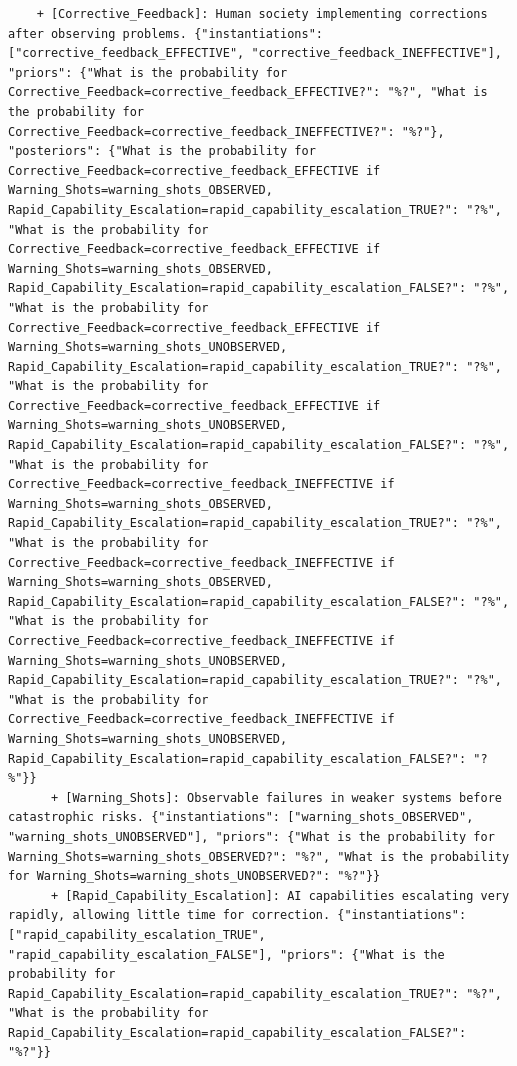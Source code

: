 \documentclass[
  11pt,
  letterpaper,
]{book}
\begin{document}
\begin{verbatim}
    + [Corrective_Feedback]: Human society implementing corrections after observing problems. {"instantiations": ["corrective_feedback_EFFECTIVE", "corrective_feedback_INEFFECTIVE"], "priors": {"What is the probability for Corrective_Feedback=corrective_feedback_EFFECTIVE?": "%?", "What is the probability for Corrective_Feedback=corrective_feedback_INEFFECTIVE?": "%?"}, "posteriors": {"What is the probability for Corrective_Feedback=corrective_feedback_EFFECTIVE if Warning_Shots=warning_shots_OBSERVED, Rapid_Capability_Escalation=rapid_capability_escalation_TRUE?": "?%", "What is the probability for Corrective_Feedback=corrective_feedback_EFFECTIVE if Warning_Shots=warning_shots_OBSERVED, Rapid_Capability_Escalation=rapid_capability_escalation_FALSE?": "?%", "What is the probability for Corrective_Feedback=corrective_feedback_EFFECTIVE if Warning_Shots=warning_shots_UNOBSERVED, Rapid_Capability_Escalation=rapid_capability_escalation_TRUE?": "?%", "What is the probability for Corrective_Feedback=corrective_feedback_EFFECTIVE if Warning_Shots=warning_shots_UNOBSERVED, Rapid_Capability_Escalation=rapid_capability_escalation_FALSE?": "?%", "What is the probability for Corrective_Feedback=corrective_feedback_INEFFECTIVE if Warning_Shots=warning_shots_OBSERVED, Rapid_Capability_Escalation=rapid_capability_escalation_TRUE?": "?%", "What is the probability for Corrective_Feedback=corrective_feedback_INEFFECTIVE if Warning_Shots=warning_shots_OBSERVED, Rapid_Capability_Escalation=rapid_capability_escalation_FALSE?": "?%", "What is the probability for Corrective_Feedback=corrective_feedback_INEFFECTIVE if Warning_Shots=warning_shots_UNOBSERVED, Rapid_Capability_Escalation=rapid_capability_escalation_TRUE?": "?%", "What is the probability for Corrective_Feedback=corrective_feedback_INEFFECTIVE if Warning_Shots=warning_shots_UNOBSERVED, Rapid_Capability_Escalation=rapid_capability_escalation_FALSE?": "?%"}}
      + [Warning_Shots]: Observable failures in weaker systems before catastrophic risks. {"instantiations": ["warning_shots_OBSERVED", "warning_shots_UNOBSERVED"], "priors": {"What is the probability for Warning_Shots=warning_shots_OBSERVED?": "%?", "What is the probability for Warning_Shots=warning_shots_UNOBSERVED?": "%?"}}
      + [Rapid_Capability_Escalation]: AI capabilities escalating very rapidly, allowing little time for correction. {"instantiations": ["rapid_capability_escalation_TRUE", "rapid_capability_escalation_FALSE"], "priors": {"What is the probability for Rapid_Capability_Escalation=rapid_capability_escalation_TRUE?": "%?", "What is the probability for Rapid_Capability_Escalation=rapid_capability_escalation_FALSE?": "%?"}}

\end{verbatim}
\end{document}
